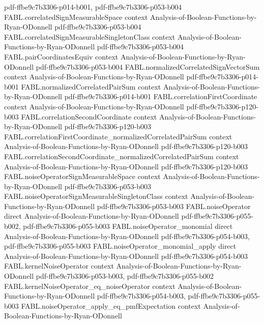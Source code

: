 \begin{theorem}
  {pdf-ffbe9c7b3306-p014-b001,
    pdf-ffbe9c7b3306-p053-b004}
\proofstep
  {FABL.correlatedSignMeasurableSpace}
  {context}
  {Analysis-of-Boolean-Functions-by-Ryan-ODonnell}
  {pdf-ffbe9c7b3306-p053-b004}
\proofstep
  {FABL.correlatedSignMeasurableSingletonClass}
  {context}
  {Analysis-of-Boolean-Functions-by-Ryan-ODonnell}
  {pdf-ffbe9c7b3306-p053-b004}
\proofstep
  {FABL.pairCoordinatesEquiv}
  {context}
  {Analysis-of-Boolean-Functions-by-Ryan-ODonnell}
  {pdf-ffbe9c7b3306-p053-b004}
\proofstep
  {FABL.normalizedCorrelatedSignVectorSum}
  {context}
  {Analysis-of-Boolean-Functions-by-Ryan-ODonnell}
  {pdf-ffbe9c7b3306-p014-b001}
\proofstep
  {FABL.normalizedCorrelatedPairSum}
  {context}
  {Analysis-of-Boolean-Functions-by-Ryan-ODonnell}
  {pdf-ffbe9c7b3306-p014-b001}
\proofstep
  {FABL.correlationFirstCoordinate}
  {context}
  {Analysis-of-Boolean-Functions-by-Ryan-ODonnell}
  {pdf-ffbe9c7b3306-p120-b003}
\proofstep
  {FABL.correlationSecondCoordinate}
  {context}
  {Analysis-of-Boolean-Functions-by-Ryan-ODonnell}
  {pdf-ffbe9c7b3306-p120-b003}
\proofstep
  {FABL.correlationFirstCoordinate_normalizedCorrelatedPairSum}
  {context}
  {Analysis-of-Boolean-Functions-by-Ryan-ODonnell}
  {pdf-ffbe9c7b3306-p120-b003}
\proofstep
  {FABL.correlationSecondCoordinate_normalizedCorrelatedPairSum}
  {context}
  {Analysis-of-Boolean-Functions-by-Ryan-ODonnell}
  {pdf-ffbe9c7b3306-p120-b003}
\proofstep
  {FABL.noiseOperatorSignMeasurableSpace}
  {context}
  {Analysis-of-Boolean-Functions-by-Ryan-ODonnell}
  {pdf-ffbe9c7b3306-p053-b003}
\proofstep
  {FABL.noiseOperatorSignMeasurableSingletonClass}
  {context}
  {Analysis-of-Boolean-Functions-by-Ryan-ODonnell}
  {pdf-ffbe9c7b3306-p053-b003}
\proofstep
  {FABL.noiseOperator}
  {direct}
  {Analysis-of-Boolean-Functions-by-Ryan-ODonnell}
  {pdf-ffbe9c7b3306-p055-b002,
    pdf-ffbe9c7b3306-p055-b003}
\proofstep
  {FABL.noiseOperator_monomial}
  {direct}
  {Analysis-of-Boolean-Functions-by-Ryan-ODonnell}
  {pdf-ffbe9c7b3306-p054-b003,
    pdf-ffbe9c7b3306-p055-b003}
\proofstep
  {FABL.noiseOperator_monomial_apply}
  {direct}
  {Analysis-of-Boolean-Functions-by-Ryan-ODonnell}
  {pdf-ffbe9c7b3306-p054-b003}
\proofstep
  {FABL.kernelNoiseOperator}
  {context}
  {Analysis-of-Boolean-Functions-by-Ryan-ODonnell}
  {pdf-ffbe9c7b3306-p053-b003,
    pdf-ffbe9c7b3306-p055-b002}
\proofstep
  {FABL.kernelNoiseOperator_eq_noiseOperator}
  {context}
  {Analysis-of-Boolean-Functions-by-Ryan-ODonnell}
  {pdf-ffbe9c7b3306-p054-b003,
    pdf-ffbe9c7b3306-p055-b003}
\proofstep
  {FABL.noiseOperator_apply_eq_pmfExpectation}
  {context}
  {Analysis-of-Boolean-Functions-by-Ryan-ODonnell}

\end{theorem}
